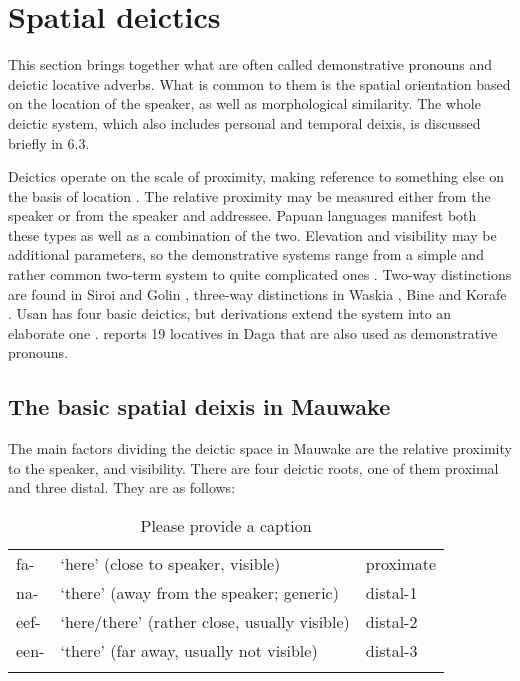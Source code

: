 \section{Spatial deictics}\label{sec:3:6}
{}
This section brings together what are often called demonstrative pronouns and deictic locative adverbs. What is common to them is the spatial orientation based on the location of the speaker, as well as morphological similarity. The whole deictic system, which also includes personal and temporal deixis, is discussed briefly in 6.3. 

Deictics operate on the scale of proximity, making reference to something else on the basis of location \citep[57--58]{HallidayEtAl1976}. The relative proximity may be measured either from the speaker or from the speaker and addressee. Papuan languages manifest both these types as well as a combination of the two. Elevation and visibility may be additional parameters, so the demonstrative systems range from a simple and rather common two-term system to quite complicated ones \citep[75--77]{Foley1986}. Two-way distinctions are found in Siroi \citep[20]{Wells1979} and Golin \citep{Bunn1974}, three-way distinctions in Waskia \citep[59]{RossEtAl1978}%
, Bine \citep{Saari1985} and Korafe \citep[65]{FarrEtAl1981}%
. Usan has four basic deictics, but derivations extend the system into an elaborate one \citep[76--81]{Reesink1987}. \citet[38--39]{Murane1974} reports 19 locatives in Daga that are also used as demonstrative pronouns. 

\subsection{The basic spatial deixis in Mauwake}\label{sec:3:y:x}
{}
The main factors dividing the deictic space in Mauwake are the relative proximity to the speaker, and visibility. There are four deictic roots, one of them proximal and three distal. They are as follows: 

\begin{table}
\caption{Please provide a caption}
\label{} 
\begin{tabular}{lll}
\mytoprule
fa- &`here' (close to speaker, visible) &proximate\\
na- &`there' (away from the speaker; generic) &distal-1\\
eef- &`here/there' (rather close, usually visible) &distal-2\\
een- &`there' (far away, usually not visible) &distal-3\\
\mybottomrule
\end{tabular}
\end{table}


